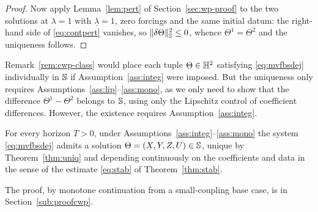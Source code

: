 \begin{proof}
Now apply Lemma~\ref{lem:pert} of Section~\ref{sec:wp-proof} to the two solutions at
$\lambda=1$ with $\underline\lambda=1$, zero forcings and the same initial datum:
the right-hand side of \eqref{eq:contpert} vanishes, so
$\|\delta\Theta\|_{\mathbb{S}}^2\le0$, whence $\Theta^1=\Theta^2$ and the uniqueness follows.
\end{proof}

\begin{remark}\label{rem:uniq-no-integ}
Remark~\ref{rem:cwp-class} would place each tuple $\Theta\in\mathbb{H}^2$ satisfying
\eqref{eq:mvfbsdej} individually in $\mathbb{S}$ if Assumption~\ref{ass:integ} were imposed. But the uniqueness only requires
Assumptions~\ref{ass:lip}--\ref{ass:mono}, as we only need to show that the difference
$\Theta^1-\Theta^2$ belongs to $\mathbb{S}$, using only the Lipschitz control of coefficient
differences. However, the existence requires Assumption~\ref{ass:integ}.
\end{remark}

\begin{theorem}\label{thm:cwp}
For every horizon $T>0$, under Assumptions~\ref{ass:integ}--\ref{ass:mono} the system
\eqref{eq:mvfbsdej} admits a solution $\Theta=(X,Y,Z,U)\in\mathbb{S}$, unique by
Theorem~\ref{thm:uniq} and depending continuously on the coefficients and data in the
sense of the estimate \eqref{eq:stab} of Theorem~\ref{thm:stab}.
\end{theorem}
\noindent The proof, by monotone continuation from a small-coupling base case, is in
Section~\ref{sub:proofcwp}.

